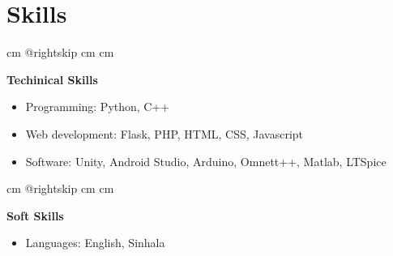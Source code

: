\documentclass[10pt, a4paper]{article}
\newenvironment{highlights}{
        \begin{itemize}[
                topsep=0pt,
                parsep=0.10 cm,
                partopsep=0pt,
                itemsep=0pt,
                after=\vspace{-1\baselineskip},
                leftmargin=0.4 cm + 3pt
            ]
    }{
        \end{itemize}
    } %
\let\hrefWithoutArrow\href
\renewcommand{\href}[2]{\hrefWithoutArrow{#1}{\mbox{\ifthenelse{\equal{#2}{}}{ }{#2 }\raisebox{.15ex}{\footnotesize \faExternalLink*}}}}
\let\originalTabularx\tabularx
\let\originalEndTabularx\endtabularx
\renewenvironment{tabularx}{\bgroup\centering\originalTabularx}{\originalEndTabularx\par\egroup}
\begin{document}
%
%
%
%
%

\vspace{0.2 cm}
 \section{Skills}

        \begingroup{} cm
        \advance\csname @rightskip cm
        \advance{} cm

        \textbf{Techinical Skills} 
        \begin{highlights}
        \item Programming: Python, C++
        \item Web development: Flask, PHP, HTML, CSS, Javascript
        \item Software: Unity, Android Studio, Arduino, Omnett++, Matlab, LTSpice \end{highlights}
        \par\endgroup

        \vspace{0.6 cm}
        \begingroup{} cm
        \advance\csname @rightskip cm
        \advance{} cm

        \textbf{Soft Skills}  \begin{highlights}
        \item Languages: English, Sinhala \end{highlights}
        \par\endgroup
    
    \vspace{0.4 cm}
    
\end{document}
